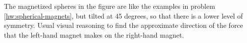 The magnetized spheres in the figure are like the examples in
problem \ref{hw:spherical-magnets}, but tilted at
45 degrees, so that there is a lower level of symmetry.
Usual visual reasoning to find the approximate direction
of the force that the left-hand magnet
makes on the right-hand magnet.
